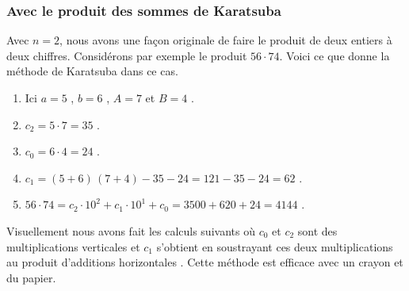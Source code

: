 \subsubsection{Avec le produit des sommes de Karatsuba}

Avec $n = 2$, nous avons une façon originale de faire le produit de deux entiers à deux chiffres. Considérons par exemple le produit $56 \cdot 74$. Voici ce que donne la méthode de Karatsuba dans ce cas.
	
\begin{enumerate}
	\item Ici $a = 5$ , $b = 6$ , $A = 7$ et $B = 4$ .

	\item $c_2 = 5 \cdot 7 = 35$ .

	\item $c_0 = 6 \cdot 4 = 24$ .

	\item $c_1 = (5 + 6) \, (7 + 4) - 35 - 24 = 121 - 35 - 24 = 62$ .

	\item $56 \cdot 74 = c_2 \cdot 10^2 + c_1 \cdot 10^1 + c_0 = 3500 + 620 + 24 = 4144$ .
\end{enumerate}
	
\medskip
	
Visuellement nous avons fait les calculs suivants où $c_0$ et $c_2$ sont des multiplications \og verticales \fg{} et $c_1$ s'obtient en soustrayant ces deux multiplications au produit \og d'additions horizontales \fg{}.
Cette méthode est efficace avec un crayon et du papier.
	

